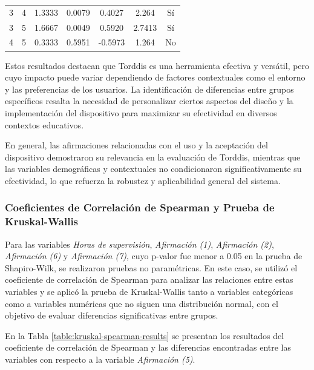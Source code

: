 \documentclass[a4paper,fleqn]{cas-sc}
\begin{document}
\begin{itemize}
\begin{table}[ht]
\begin{tabularx}{0.75\textwidth}{ccccccc}
						\hline
						3 & 4 & 1.3333 & 0.0079 & 0.4027 & 2.264 & Sí \\
						3 & 5 & 1.6667 & 0.0049 & 0.5920 & 2.7413 & Sí \\
						4 & 5 & 0.3333 & 0.5951 & -0.5973 & 1.264 & No \\
						\hline
					\end{tabularx}
					\label{table:posthoc_6y7}
				\end{table}
				\end{itemize}
				
				Estos resultados destacan que Torddis es una herramienta efectiva y versátil, pero cuyo impacto puede variar dependiendo de factores contextuales como el entorno y las preferencias de los usuarios. La identificación de diferencias entre grupos específicos resalta la necesidad de personalizar ciertos aspectos del diseño y la implementación del dispositivo para maximizar su efectividad en diversos contextos educativos.
				
				En general, las afirmaciones relacionadas con el uso y la aceptación del dispositivo demostraron su relevancia en la evaluación de Torddis, mientras que las variables demográficas y contextuales no condicionaron significativamente su efectividad, lo que refuerza la robustez y aplicabilidad general del sistema.
			
			\subsubsection{Coeficientes de Correlación de Spearman y Prueba de Kruskal-Wallis}
				Para las variables \textit{Horas de supervisión}, \textit{Afirmación (1)}, \textit{Afirmación (2)}, \textit{Afirmación (6)} y \textit{Afirmación (7)}, cuyo p-valor fue menor a 0.05 en la prueba de Shapiro-Wilk, se realizaron pruebas no paramétricas. En este caso, se utilizó el coeficiente de correlación de Spearman para analizar las relaciones entre estas variables y se aplicó la prueba de Kruskal-Wallis tanto a variables categóricas como a variables numéricas que no siguen una distribución normal, con el objetivo de evaluar diferencias significativas entre grupos.
				
				En la Tabla \ref{table:kruskal-spearman-results} se presentan los resultados del coeficiente de correlación de Spearman y las diferencias encontradas entre las variables con respecto a la variable \textit{Afirmación (5)}.
				
\end{document}

